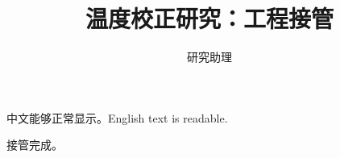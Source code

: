 \documentclass[UTF8,fontset=fandol,a4paper,11pt]{ctexart}
\title{温度校正研究：工程接管}
\author{研究助理}
\date{}
\begin{document}
\maketitle
中文能够正常显示。English text is readable.

接管完成。
\end{document}
